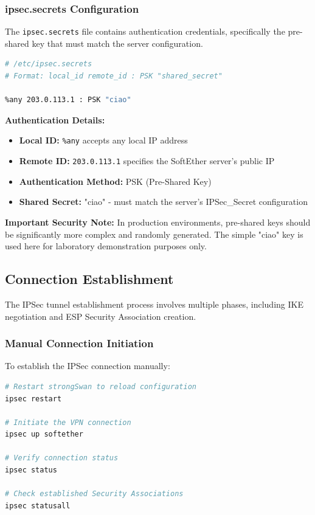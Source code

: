 \subsubsection{ipsec.secrets Configuration}

The \texttt{ipsec.secrets} file contains authentication credentials, specifically the pre-shared key that must match the server configuration.

\begin{lstlisting}[language=bash]
# /etc/ipsec.secrets
# Format: local_id remote_id : PSK "shared_secret"

%any 203.0.113.1 : PSK "ciao"
\end{lstlisting}

\textbf{Authentication Details:}

\begin{itemize}
    \item \textbf{Local ID:} \texttt{\%any} accepts any local IP address
    \item \textbf{Remote ID:} \texttt{203.0.113.1} specifies the SoftEther server's public IP
    \item \textbf{Authentication Method:} PSK (Pre-Shared Key)
    \item \textbf{Shared Secret:} "ciao" - must match the server's IPSec\_Secret configuration
\end{itemize}

\noindent
\textbf{Important Security Note:} In production environments, pre-shared keys should be significantly more complex and randomly generated. The simple "ciao" key is used here for laboratory demonstration purposes only.

\subsection{Connection Establishment}

The IPSec tunnel establishment process involves multiple phases, including IKE negotiation and ESP Security Association creation.

\subsubsection{Manual Connection Initiation}

To establish the IPSec connection manually:

\begin{lstlisting}[language=bash]
# Restart strongSwan to reload configuration
ipsec restart

# Initiate the VPN connection
ipsec up softether

# Verify connection status
ipsec status

# Check established Security Associations
ipsec statusall
\end{lstlisting}


